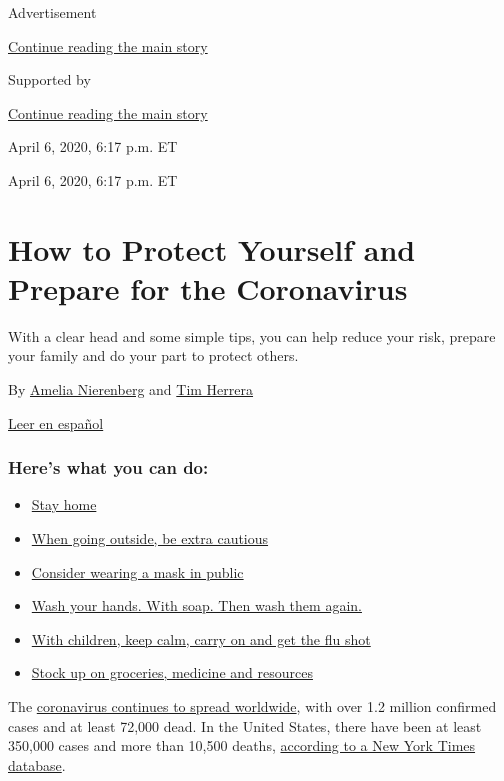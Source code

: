 Advertisement

\protect\hyperlink{after-top}{Continue reading the main story}

Supported by

\protect\hyperlink{after-sponsor}{Continue reading the main story}

April 6, 2020, 6:17 p.m. ET

April 6, 2020, 6:17 p.m. ET

\hypertarget{how-to-protect-yourself-and-prepare-for-the-coronavirus}{%
\section{How to Protect Yourself and Prepare for the
Coronavirus}\label{how-to-protect-yourself-and-prepare-for-the-coronavirus}}

With a clear head and some simple tips, you can help reduce your risk,
prepare your family and do your part to protect others.

By \href{https://www.nytimes3xbfgragh.onion/by/amelia-nierenberg}{Amelia
Nierenberg} and
\href{https://www.nytimes3xbfgragh.onion/by/tim-herrera}{Tim Herrera}

\href{https://www.nytimes3xbfgragh.onion/es/article/el-coronavirus-proteger-preparar.html}{Leer
en español}

\hypertarget{heres-what-you-can-do}{%
\subsubsection{Here's what you can do:}\label{heres-what-you-can-do}}

\begin{itemize}
\tightlist
\item
  \protect\hyperlink{link-5b4d0175}{Stay home}
\item
  \protect\hyperlink{link-7e8a3c72}{When going outside, be extra
  cautious}
\item
  \protect\hyperlink{link-2963e7f4}{Consider wearing a mask in public}
\item
  \protect\hyperlink{link-364448a4}{Wash your hands. With soap. Then
  wash them again.}
\item
  \protect\hyperlink{link-4b7fc30f}{With children, keep calm, carry on
  and get the flu shot}
\item
  \protect\hyperlink{link-385f8aea}{Stock up on groceries, medicine and
  resources}
\end{itemize}

The
\href{https://www.nytimes3xbfgragh.onion/news-event/coronavirus}{coronavirus
continues to spread worldwide}, with over 1.2 million confirmed cases
and at least 72,000 dead. In the United States, there have been at least
350,000 cases and more than 10,500 deaths,
\href{https://www.nytimes3xbfgragh.onion/interactive/2020/world/coronavirus-maps.html?action=click\&module=RelatedLinks\&pgtype=Article}{according
to a New York Times database}.

